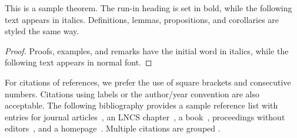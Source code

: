 \documentclass[runningheads]{llncs}
\begin{document}
\begin{theorem}
This is a sample theorem. The run-in heading is set in bold, while
the following text appears in italics. Definitions, lemmas,
propositions, and corollaries are styled the same way.
\end{theorem}
%
%
\begin{proof}
Proofs, examples, and remarks have the initial word in italics,
while the following text appears in normal font.
\end{proof}
For citations of references, we prefer the use of square brackets
and consecutive numbers. Citations using labels or the author/year
convention are also acceptable. The following bibliography provides
a sample reference list with entries for journal
articles~\cite{ref1}, an LNCS chapter~\cite{ref2}, a
book~\cite{ref1}, proceedings without editors~\cite{ref1},
and a homepage~\cite{ref_2}. Multiple citations are grouped
\cite{ref1,ref2}.
%
%
% 
% 
%


\end{document}
